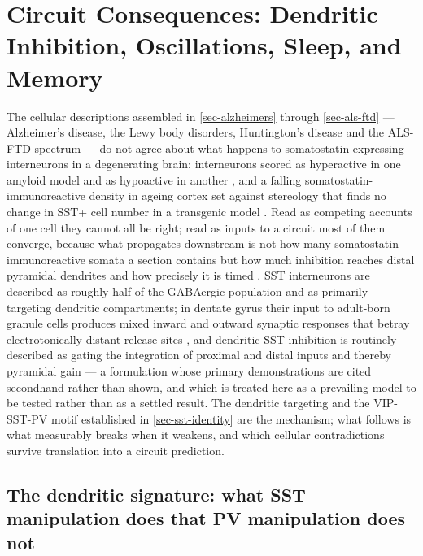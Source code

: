 \documentclass[11pt]{article}
\begin{document}
\section{Circuit Consequences: Dendritic Inhibition, Oscillations, Sleep, and Memory}
\label{sec-circuit-consequences}

The cellular descriptions assembled in \ref{sec-alzheimers} through \ref{sec-als-ftd} --- Alzheimer's disease, the Lewy body disorders, Huntington's disease and the ALS-FTD spectrum --- do not agree about what happens to somatostatin-expressing interneurons in a degenerating brain: interneurons scored as hyperactive in one amyloid model and as hypoactive in another \citep{MelgosaEcenarro2026,Meftah2026}, and a falling somatostatin-immunoreactive density in ageing cortex set against stereology that finds no change in SST+ cell number in a transgenic model \citep{Ouellet2014,Futacsi2025}. Read as competing accounts of one cell they cannot all be right; read as inputs to a circuit most of them converge, because what propagates downstream is not how many somatostatin-immunoreactive somata a section contains but how much inhibition reaches distal pyramidal dendrites and how precisely it is timed \citep{Yao2025,Udakis2020}. SST interneurons are described as roughly half of the GABAergic population and as primarily targeting dendritic compartments; in dentate gyrus their input to adult-born granule cells produces mixed inward and outward synaptic responses that betray electrotonically distant release sites \citep{Groisman2020}, and dendritic SST inhibition is routinely described as gating the integration of proximal and distal inputs and thereby pyramidal gain \citep{Taxidis2025} --- a formulation whose primary demonstrations are cited secondhand rather than shown, and which is treated here as a prevailing model to be tested rather than as a settled result. The dendritic targeting and the VIP-SST-PV motif established in \ref{sec-sst-identity} are the mechanism; what follows is what measurably breaks when it weakens, and which cellular contradictions survive translation into a circuit prediction.

\subsection{The dendritic signature: what SST manipulation does that PV manipulation does not}
\label{sec-08-dendritic-signature}
\end{document}
